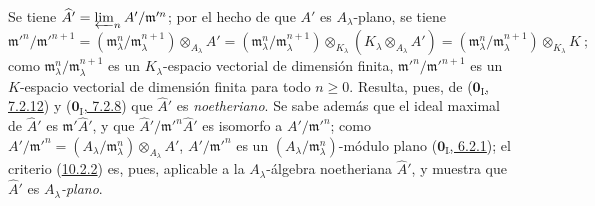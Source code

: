 Se tiene $\widehat A'=\varprojlim_n A'/\mathfrak m'^{n}$;
por el hecho de que $A'$ es $A_\lambda$-plano, se tiene
\[
  \mathfrak m'^{n}/\mathfrak m'^{n+1}
  =(\mathfrak m_\lambda^n/\mathfrak m_\lambda^{n+1})
    \otimes_{A_\lambda}A'
  =(\mathfrak m_\lambda^n/\mathfrak m_\lambda^{n+1})
    \otimes_{K_\lambda}(K_\lambda\otimes_{A_\lambda}A')
  =(\mathfrak m_\lambda^n/\mathfrak m_\lambda^{n+1})
    \otimes_{K_\lambda}K~;
\]
como $\mathfrak m_\lambda^n/\mathfrak m_\lambda^{n+1}$ es un $K_\lambda$-espacio vectorial de dimensión finita, $\mathfrak m'^{n}/\mathfrak m'^{n+1}$ es un $K$-espacio vectorial de dimensión finita para todo $n\geq0$. Resulta, pues, de (\hyperref[0.7.2.12-fr]{$\mathbf{0}_{\mathrm I}$, 7.2.12}) y (\hyperref[0.7.2.8-fr]{$\mathbf{0}_{\mathrm I}$, 7.2.8}) que $\widehat A'$ es \emph{noetheriano}.
Se sabe además que el ideal maximal de $\widehat A'$ es $\mathfrak m'\widehat A'$, y que $\widehat A'/\mathfrak m'^{n}\widehat A'$ es isomorfo a $A'/\mathfrak m'^{n}$;
como $A'/\mathfrak m'^{n}=(A_\lambda/\mathfrak m_\lambda^n)
\otimes_{A_\lambda}A'$,
$A'/\mathfrak m'^{n}$ es un $(A_\lambda/\mathfrak m_\lambda^n)$-módulo plano (\hyperref[0.6.2.1-fr]{$\mathbf{0}_{\mathrm I}$, 6.2.1}); el criterio (\hyperref[0.10.2.2-fr]{10.2.2}) es, pues, aplicable a la $A_\lambda$-álgebra noetheriana $\widehat A'$, y muestra que $\widehat A'$ es \emph{$A_\lambda$-plano}.


